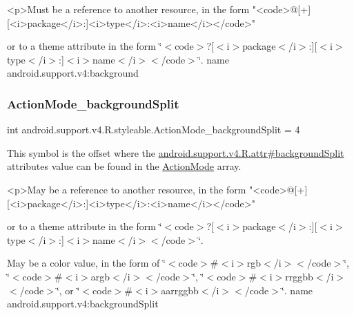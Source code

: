\begin{DoxyVerb}      <p>Must be a reference to another resource, in the form "<code>@[+][<i>package</i>:]<i>type</i>:<i>name</i></code>"
\end{DoxyVerb}
 or to a theme attribute in the form \char`\"{}$<$code$>$?\mbox{[}$<$i$>$package$<$/i$>$\+:\mbox{]}\mbox{[}$<$i$>$type$<$/i$>$\+:\mbox{]}$<$i$>$name$<$/i$>$$<$/code$>$\char`\"{}.  name android.\+support.\+v4\+:background \mbox{\label{classandroid_1_1support_1_1v4_1_1R_1_1styleable_a094ac55778c3da81ee995f4d661dcdd3}} 
\subsubsection{\texorpdfstring{Action\+Mode\+\_\+background\+Split}{ActionMode\_backgroundSplit}}
{\footnotesize\ttfamily int android.\+support.\+v4.\+R.\+styleable.\+Action\+Mode\+\_\+background\+Split = 4\hspace{0.3cm}{\ttfamily [static]}}

This symbol is the offset where the \hyperlink{classandroid_1_1support_1_1v4_1_1R_1_1attr_accf7c5a5b1116cb065de3d8e2451c213}{android.\+support.\+v4.\+R.\+attr\#background\+Split} attribute\textquotesingle{}s value can be found in the \hyperlink{classandroid_1_1support_1_1v4_1_1R_1_1styleable_abc7d063172fa73270c0ab8e5f7093972}{Action\+Mode} array.

\begin{DoxyVerb}      <p>May be a reference to another resource, in the form "<code>@[+][<i>package</i>:]<i>type</i>:<i>name</i></code>"
\end{DoxyVerb}
 or to a theme attribute in the form \char`\"{}$<$code$>$?\mbox{[}$<$i$>$package$<$/i$>$\+:\mbox{]}\mbox{[}$<$i$>$type$<$/i$>$\+:\mbox{]}$<$i$>$name$<$/i$>$$<$/code$>$\char`\"{}. 

May be a color value, in the form of \char`\"{}$<$code$>$\#$<$i$>$rgb$<$/i$>$$<$/code$>$\char`\"{}, \char`\"{}$<$code$>$\#$<$i$>$argb$<$/i$>$$<$/code$>$\char`\"{}, \char`\"{}$<$code$>$\#$<$i$>$rrggbb$<$/i$>$$<$/code$>$\char`\"{}, or \char`\"{}$<$code$>$\#$<$i$>$aarrggbb$<$/i$>$$<$/code$>$\char`\"{}.  name android.\+support.\+v4\+:background\+Split \mbox{\label{classandroid_1_1support_1_1v4_1_1R_1_1styleable_ac74559c17d14835068971c8a43ee0089}} 
